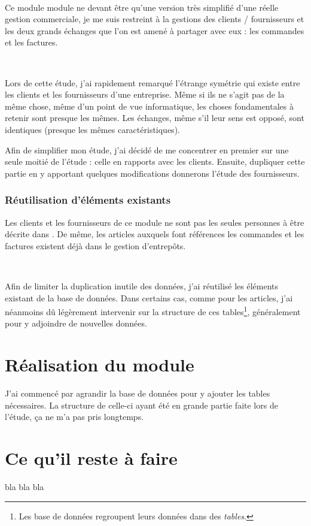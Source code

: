 ~

Ce module module ne devant être qu'une version très simplifié d'une \og réelle \fg{} gestion commerciale, je me suis restreint à la gestions des clients / fournisseurs et les deux grands échanges que l'on est amené à partager avec eux : les commandes et les factures.

~

Lors de cette étude, j'ai rapidement remarqué l'étrange symétrie qui existe entre les clients et les fournisseurs d'une entreprise. Même si ils ne s'agit pas de la même chose, même d'un point de vue informatique, les choses fondamentales à retenir sont presque les mêmes. Les échanges, même s'il leur sens est opposé, sont identiques (presque les mêmes caractéristiques).

Afin de simplifier mon étude, j'ai décidé de me concentrer en premier sur une seule moitié de l'étude : celle en rapports avec les clients. Ensuite, dupliquer cette partie en y apportant quelques modifications donnerons l'étude des fournisseurs.

\subsubsection{Réutilisation d'éléments existants}
Les clients et les fournisseurs de ce module ne sont pas les seules \og personnes \fg{} à être décrite dans \integrale. De même, les articles auxquels font références les commandes et les factures existent déjà dans le gestion d'entrepôts.

~

Afin de limiter la duplication inutile des données, j'ai réutilisé les éléments existant de la base de données. Dans certains cas, comme pour les articles, j'ai néanmoins dû légèrement intervenir sur la structure de ces tables\footnote{Les base de données regroupent leurs données dans des \emph{tables}.}, généralement pour y adjoindre de nouvelles données.

\section{Réalisation du module}
J'ai commencé par agrandir la base de données pour y ajouter les tables nécessaires. La structure de celle-ci ayant été en grande partie faite lors de l'étude, ça ne m'a pas pris longtemps.

\section{Ce qu'il reste à faire}
bla bla bla

